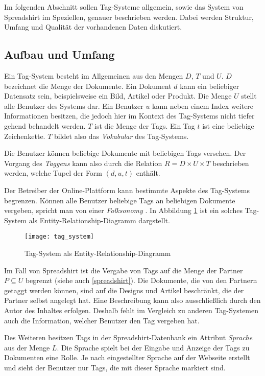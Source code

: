 Im folgenden Abschnitt sollen Tag-Systeme allgemein, sowie das System von Spreadshirt im Speziellen, genauer beschrieben werden. Dabei werden Struktur, Umfang und Qualität der vorhandenen Daten diskutiert.

\subsection{Aufbau und Umfang}
\label{tag-system}

Ein Tag-System besteht im Allgemeinen aus den Mengen \(D\), \(T\) und \(U\). \(D\) bezeichnet die Menge der Dokumente. Ein Dokument \(d\) kann ein beliebiger Datensatz sein, beispielsweise ein Bild, Artikel oder Produkt. Die Menge \(U\) stellt alle Benutzer des Systems dar. Ein Benutzer \(u\) kann neben einem Index weitere Informationen besitzen, die jedoch hier im Kontext des Tag-Systems nicht tiefer gehend behandelt werden. \(T\) ist die Menge der Tags. Ein Tag \(t\) ist eine beliebige Zeichenkette. \(T\) bildet also das \emph{Vokabular} des Tag-Systems.

Die Benutzer können beliebige Dokumente mit beliebigen Tags versehen. Der Vorgang des \emph{Taggens} kann also durch die Relation \(R = D \times U \times T\) beschrieben werden, welche Tupel der Form \((d, u, t)\) enthält.

Der Betreiber der Online-Plattform kann bestimmte Aspekte des Tag-Systems begrenzen. Können alle Benutzer beliebige Tags an beliebigen Dokumente vergeben, spricht man von einer \emph{Folksonomy} \cite{ip2009}. In Abbildung \ref{fig:tagsystem} ist ein solches Tag-System als Entity-Relationship-Diagramm dargstellt.

\begin{figure}
\centering
\texttt{[image: tag\_system]}
\caption{Tag-System als Entity-Relationship-Diagramm}
\label{fig:tagsystem}
\end{figure}


Im Fall von Spreadshirt ist die Vergabe von Tags auf die Menge der Partner \(P \subseteq U\) begrenzt (siehe auch \ref{spreadshirt}). Die Dokumente, die von den Partnern getaggt werden können, sind auf die Designs und Artikel beschränkt, die der Partner selbst angelegt hat. Eine Beschreibung kann also ausschließlich durch den Autor des Inhaltes erfolgen. Deshalb fehlt im Vergleich zu anderen Tag-Systemen auch die Information, welcher Benutzer den Tag vergeben hat.

Des Weiteren besitzen Tags in der Spreadshirt-Datenbank ein Attribut \emph{Sprache} aus der Menge \(L\). Die Sprache spielt bei der Eingabe und Anzeige der Tags zu Dokumenten eine Rolle. Je nach eingestellter Sprache auf der Webseite erstellt und sieht der Benutzer nur Tags, die mit dieser Sprache markiert sind.

